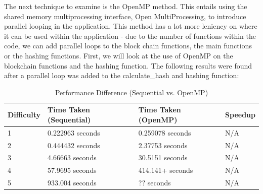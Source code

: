 \documentclass[12pt, a4paper]{article}
\begin{document}
The next technique to examine is the OpenMP method. This entails using the shared memory multiprocessing interface, Open MultiProcessing, to introduce parallel looping in the application. This method has a lot more leniency on where it can be used within the application - due to the number of functions within the code, we can add parallel loops to the block chain functions, the main functions or the hashing functions. First, we will look at the use of OpenMP on the blockchain functions and the hashing function. The following results were found after a parallel loop was added to the calculate\_hash and hashing function: 

\begin{table}[H]
    \centering
    \begin{tabular}{| l | l | l | l |}
    \hline
    Difficulty & Time Taken (Sequential) & Time Taken (OpenMP) & Speedup\\ \hline
    1 & 0.222963 seconds & 0.259078 seconds & N/A \\ \hline
    2 & 0.444432 seconds & 2.37753 seconds & N/A \\ \hline
    3 & 4.66663 seconds & 30.5151 seconds & N/A \\ \hline
    4 & 57.9695 seconds & 414.141+ seconds & N/A \\ \hline
    5 & 933.004 seconds & ?? seconds & N/A \\ \hline
    \end{tabular}
    \caption{Performance Difference (Sequential vs. OpenMP)}
\end{table}
\end{document}
